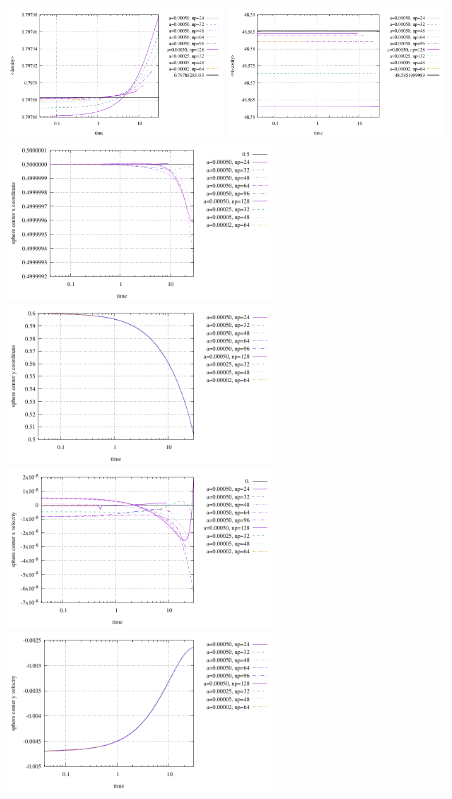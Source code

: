 \begin{center}
\includegraphics[width=5.7cm]{python_codes/fieldstone_93/results/avrg_density}
\includegraphics[width=5.7cm]{python_codes/fieldstone_93/results/avrg_viscosity}\\
\includegraphics[width=7cm]{python_codes/fieldstone_93/results/center_position_x}
\includegraphics[width=7cm]{python_codes/fieldstone_93/results/center_position_y}\\
\includegraphics[width=7cm]{python_codes/fieldstone_93/results/center_velocity_x}
\includegraphics[width=7cm]{python_codes/fieldstone_93/results/center_velocity_y}\\

\end{center}
